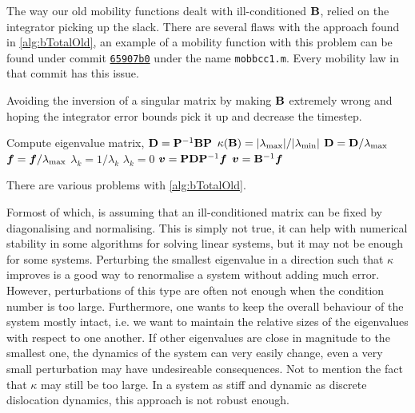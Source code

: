 The way our old mobility functions dealt with ill-conditioned $\mathbf{B}$, relied on the integrator picking up the slack. There are several flaws with the approach found in \cref{alg:bTotalOld}, an example of a mobility function with this problem can be found under commit \href{https://github.com/TarletonGroup/EasyDD/blob/65907b022d1fe408fc1b2e5c5ca2bd1797ccae04/mobbcc1.m#L68}{\texttt{65907b0}} under the name \texttt{mobbcc1.m}. Every mobility law in that commit has this issue.
\begin{algorithm}
    \caption[Bad way of avoiding drag matrix inversion singularity.]{Avoiding the inversion of a singular matrix by making $\mathbf{B}$ extremely wrong and hoping the integrator error bounds pick it up and decrease the timestep.}
    \label{alg:bTotalOld}
    \begin{algorithmic}
        \State Compute eigenvalue matrix, $\mathbf{D} = \mathbf{P}^{-1} \mathbf{B} \mathbf{P}$
        \State $\kappa(\mathbf{B}) = \lvert \lambda_{\textrm{max}} \rvert/ \lvert \lambda_{\textrm{min}} \rvert$
        \State $\mathbf{D} = \mathbf{D} / \lambda_{\textrm{max}}$
        \State $\vec{f} = \vec{f} / \lambda_{\rvar{max}}$
        \State $\lambda_k = 1/\lambda_k$
        \Else
        \State $\lambda_k = 0$
        \EndIf
        \EndFor
        \State $\vec{v} = \mtx{P} \mtx{D} \mtx{P}^{-1} \vec{f}$
        \Else
        \State $\vec{v} = \mtx{B}^{-1} \vec{f}$
        \EndIf
    \end{algorithmic}
\end{algorithm}
There are various problems with \cref{alg:bTotalOld}.

Formost of which, is assuming that an ill-conditioned matrix can be fixed by diagonalising and normalising. This is simply not true, it can help with numerical stability in some algorithms for solving linear systems, but it may not be enough for some systems. Perturbing the smallest eigenvalue in a direction such that $\kappa$ improves is a good way to renormalise a system without adding much error. However, perturbations of this type are often not enough when the condition number is too large. Furthermore, one wants to keep the overall behaviour of the system mostly intact, i.e. we want to maintain the relative sizes of the eigenvalues with respect to one another. If other eigenvalues are close in magnitude to the smallest one, the dynamics of the system can very easily change, even a very small perturbation may have undesireable consequences. Not to mention the fact that $\kappa$ may still be too large. In a system as stiff and dynamic as discrete dislocation dynamics, this approach is not robust enough.

